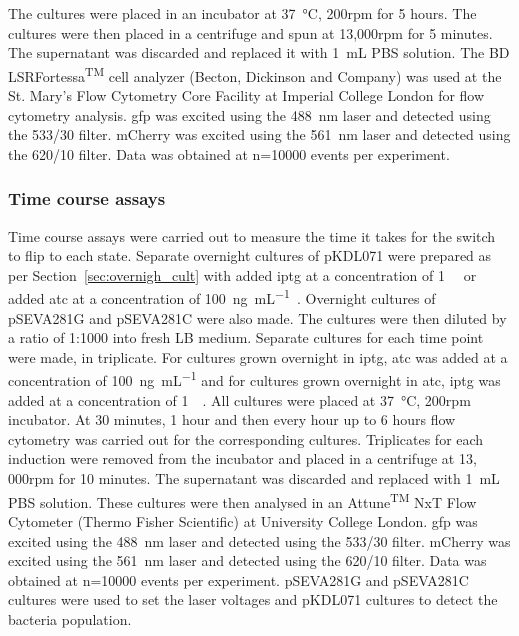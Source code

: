 The cultures were placed in an incubator at \SI{37}{\celsius}, 200rpm for 5 hours. The cultures were then placed in a centrifuge and spun at 13,000rpm for 5 minutes. The supernatant was discarded and replaced it with \SI{1}{\milli\liter} PBS solution. The BD LSRFortessa\textsuperscript{TM} cell analyzer (Becton, Dickinson and Company) was used at the St. Mary's Flow Cytometry Core Facility at Imperial College London  for flow cytometry analysis. \acrshort{gfp} was excited using the \SI{488}{\nano\meter} laser and detected using the 533/30 filter. mCherry was excited using the \SI{561}{\nano\meter} laser and detected using the 620/10 filter. Data was obtained at n=10000 events per experiment. 

\subsubsection{Time course assays}
\label{sec:flo_time}
Time course assays were carried out to measure the time it takes for the switch to flip to each state. Separate overnight cultures of pKDL071 were prepared as per Section~\ref{sec:overnigh_cult} with added \acrshort{iptg} at a concentration of \SI{1}{\milli\molar} or added \acrshort{atc} at a concentration of \SI{100}{\nano\gram\per\milli\liter}~\autocite{Litcofsky:2012gr}. Overnight cultures of pSEVA281G and pSEVA281C were also made. The cultures were then diluted by a ratio of 1:1000 into fresh LB medium. Separate cultures for each time point were made, in triplicate. For cultures grown overnight in \acrshort{iptg}, \acrshort{atc} was added at a concentration of \SI{100}{\nano\gram\per\milli\liter} and for cultures grown overnight in \acrshort{atc}, \acrshort{iptg} was added at a concentration of \SI{1}{\milli\molar}. All cultures were placed at \SI{37}{\celsius}, 200rpm incubator. At 30 minutes, 1 hour and then every hour up to 6 hours flow cytometry was carried out for the corresponding cultures. Triplicates for each induction were removed from the incubator and placed in a centrifuge at 13, 000rpm for 10 minutes. The supernatant was discarded and replaced with \SI{1}{\milli\liter} PBS solution. These cultures were then analysed in an Attune\textsuperscript{TM} NxT Flow Cytometer (Thermo Fisher Scientific) at University College London. \acrshort{gfp} was excited using the \SI{488}{\nano\meter} laser and detected using the 533/30 filter. mCherry was excited using the \SI{561}{\nano\meter} laser and detected using the 620/10 filter. Data was obtained at n=10000 events per experiment. pSEVA281G and pSEVA281C cultures were used to set the laser voltages and pKDL071 cultures to detect the bacteria population.  


